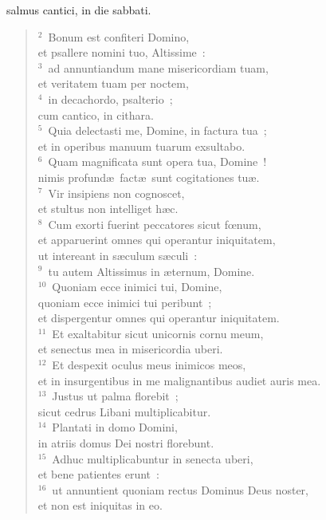 \bchapter[Psalm]
salmus cantici, in die sabbati.
\begin{verse}${}^{2}$~Bonum est confiteri Domino,\\ et psallere nomini tuo, Altissime~:\\
${}^{3}$~ad annuntiandum mane misericordiam tuam,\\ et veritatem tuam per noctem,\\
${}^{4}$~in decachordo, psalterio~;\\ cum cantico, in cithara.\\
${}^{5}$~Quia delectasti me, Domine, in factura tua~;\\ et in operibus manuum tuarum exsultabo.\\
${}^{6}$~Quam magnificata sunt opera tua, Domine~!\\ nimis profund\ae\ fact\ae\ sunt cogitationes tu\ae .\\
${}^{7}$~Vir insipiens non cognoscet,\\ et stultus non intelliget h\ae c.\\
${}^{8}$~Cum exorti fuerint peccatores sicut fœnum,\\ et apparuerint omnes qui operantur iniquitatem,\\ ut intereant in s\ae culum s\ae culi~:\\
${}^{9}$~tu autem Altissimus in \ae ternum, Domine.\\
${}^{10}$~Quoniam ecce inimici tui, Domine,\\ quoniam ecce inimici tui peribunt~;\\ et dispergentur omnes qui operantur iniquitatem.\\
${}^{11}$~Et exaltabitur sicut unicornis cornu meum,\\ et senectus mea in misericordia uberi.\\
${}^{12}$~Et despexit oculus meus inimicos meos,\\ et in insurgentibus in me malignantibus audiet auris mea.\\
${}^{13}$~Justus ut palma florebit~;\\ sicut cedrus Libani multiplicabitur.\\
${}^{14}$~Plantati in domo Domini,\\ in atriis domus Dei nostri florebunt.\\
${}^{15}$~Adhuc multiplicabuntur in senecta uberi,\\ et bene patientes erunt~:\\
${}^{16}$~ut annuntient quoniam rectus Dominus Deus noster,\\ et non est iniquitas in eo.\end{verse}



